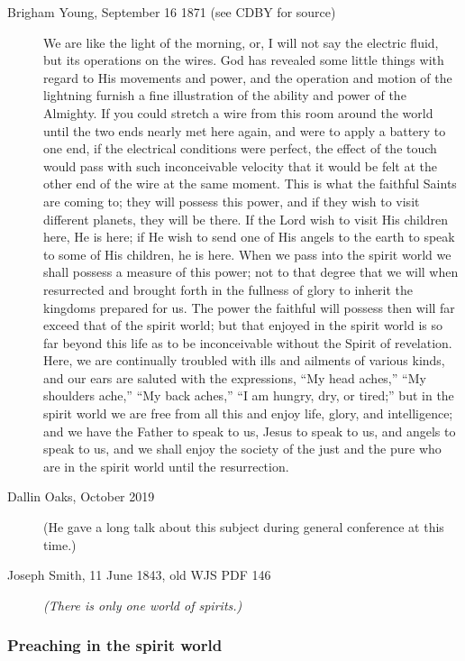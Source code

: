 		\begin{description}
		
			\item[Brigham Young, September 16 1871 (see CDBY for source)] We are like the light of the morning, or, I will not say the electric fluid, but its operations on the wires. God has revealed some little things with regard to His movements and power, and the operation and motion of the lightning furnish a fine illustration of the ability and power of the Almighty. If you could stretch a wire from this room around the world until the two ends nearly met here again, and were to apply a battery to one end, if the electrical conditions were perfect, the effect of the touch would pass with such inconceivable velocity that it would be felt at the other end of the wire at the same moment. This is what the faithful Saints are coming to; they will possess this power, and if they wish to visit different planets, they will be there. If the Lord wish to visit His children here, He is here; if He wish to send one of His angels to the earth to speak to some of His children, he is here. When we pass into the spirit world we shall possess a measure of this power; not to that degree that we will when resurrected and brought forth in the fullness of glory to inherit the kingdoms prepared for us. The power the faithful will possess then will far exceed that of the spirit world; but that enjoyed in the spirit world is so far beyond this life as to be inconceivable without the Spirit of revelation. Here, we are continually troubled with ills and ailments of various kinds, and our ears are saluted with the expressions, ``My head aches,'' ``My shoulders ache,'' ``My back aches,'' ``I am hungry, dry, or tired;'' but in the spirit world we are free from all this and enjoy life, glory, and intelligence; and we have the Father to speak to us, Jesus to speak to us, and angels to speak to us, and we shall enjoy the society of the just and the pure who are in the spirit world until the resurrection.
			
			\item[Dallin Oaks, October 2019] (He gave a long talk about this subject during general conference at this time.)
			
			\item[Joseph Smith, 11 June 1843, old WJS PDF 146] \textit{(There is only one world of spirits.)}
		
		\end{description}
		
		\subsubsection{Preaching in the spirit world}
		
